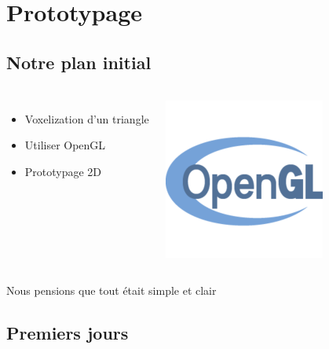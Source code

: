 \section{Prototypage}

\subsection{Notre plan initial}

\begin{frame}[fragile=singleslide]{\insertsectionhead}
  \framesubtitle{\insertsubsectionhead}
  \begin{columns}[T,onlytextwidth]
    \vspace{0.8cm}
      \begin{itemize}
        \item Voxelization d'un triangle
        \item Utiliser OpenGL
        \item Prototypage 2D
      \end{itemize}
      \includegraphics[scale=0.5]{resources/opengl_logo.png}
  \end{columns}
  \vfill
  \vfill
  \hspace{0.2cm}
  {\large Nous pensions que tout était simple et clair}
\end{frame}

\subsection{Premiers jours}

